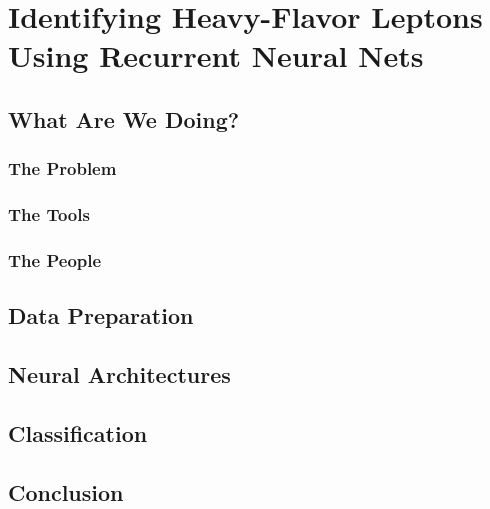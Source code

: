 \chapter{Identifying Heavy-Flavor Leptons Using Recurrent Neural Nets}

\section{What Are We Doing?}

\subsection{The Problem}

\subsection{The Tools}

\subsection{The People}

\section{Data Preparation}

\section{Neural Architectures}

\section{Classification}

\section{Conclusion}